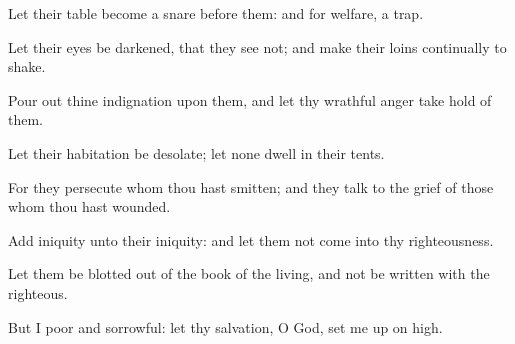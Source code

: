 {\Q {}Let their
table become a
snare
before them: and
{} for
{}
welfare,
{} a
trap.


\par }{\Q {}Let their
eyes be
darkened, that they
see not; and make their
loins
continually to
shake.


\par }{\Q {}Pour
out thine
indignation upon them, and let thy
wrathful
anger take
hold of them.


\par }{\Q {}Let their
habitation be
desolate;
{} let none
dwell in their
tents.


\par }{\Q {}For they
persecute
{} whom thou hast
smitten; and they
talk to the
grief of those whom thou hast
wounded.


\par }{\Q {}Add
iniquity unto their
iniquity: and let them not
come into thy
righteousness.


\par }{\Q {}Let them be
blotted out of the
book of the
living, and not be
written with the
righteous.


\par }{\Q {}But I
{}
poor and
sorrowful: let thy
salvation, O
God, set me up on
high.


\par }{\BB \par }
